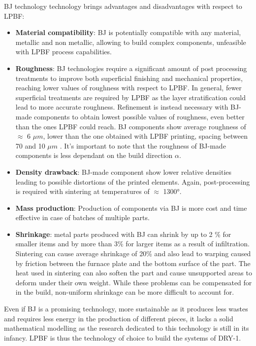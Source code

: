 BJ technology technology brings advantages and disadvantages with respect to LPBF:
\begin{itemize}
  \item \textbf{Material compatibility}: BJ is potentially compatible with any material, metallic and non metallic, allowing to build complex components, unfeasible with LPBF process capabilities.
  \item \textbf{Roughness}: BJ technologies require a significant amount of post processing treatments to improve both superficial finishing and mechanical properties, reaching lower values of roughness with respect to LPBF. In general, fewer superficial treatments are required by LPBF as the layer stratification could lead to more accurate roughness. Refinement is instead necessary with BJ-made components to obtain lowest possible values of roughness, even better than the ones LPBF could reach. BJ components show average roughness of $\approx$ 6 $\mu m$, lower than the one obtained with LPBF printing, spacing between 70 and 10 $\mu m$ \cite{tesi_dottorato}.
  It's important to note that the roughness of BJ-made components is less dependant on the build direction $\alpha$. 
  \item  \textbf{Density drawback}: BJ-made component show lower relative densities leading to possible distortions of the printed elements. Again, post-processing is required with sintering at temperatures of $\approx$ 1300°. 
  \item \textbf{Mass production}: Production of components via BJ is more cost and time effective in case of batches of multiple parts. 
  \item \textbf{Shrinkage}: metal parts produced with BJ can shrink by up to 2 \% for smaller items and by more than 3\% for larger items as a result of infiltration. Sintering can cause average shrinkage of 20\% and also lead to warping caused by friction between the furnace plate and the bottom surface of the part. The heat used in sintering can also soften the part and cause unsupported areas to deform under their own weight. While these problems can be compensated for in the build, non-uniform shrinkage can be more difficult to account for\cite{bj_camb}.
\end{itemize}

Even if BJ is a promising technology, more sustainable as it produces less wastes and requires less energy in the production of different pieces, it lacks a solid mathematical modelling\cite{bj_inconel} as the research dedicated to this technology is still in its infancy. LPBF is thus the technology of choice to build the systems of DRY-1.

